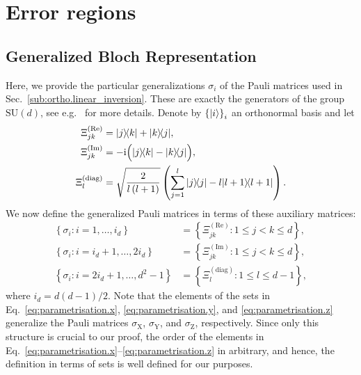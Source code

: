 
\chapter{Error regions}%
\label{cha:error_appendix}

\section{Generalized Bloch Representation}
\label{sec:error.parametrisation}

Here, we provide the particular generalizations $\sigma_{i}$ of the Pauli matrices used in Sec.~\ref{sub:ortho.linear_inversion}.
These are exactly the generators of the group $\mathrm{SU}(d)$, see e.g.~\cite{Kimura_2003_Bloch,Byrd_2003_Characterization} for more details.
Denote by  ${\{\ket{i}\}}_i$ an orthonormal basis and let
\begin{align*}
  \Xi_{jk}^{(\textrm{Re})} &=  \ket{j}\bra{k} + \ket{k}\bra{j}, \\
  \Xi_{jk}^{(\textrm{Im})} &= -\ii \Big(\ket{j}\bra{k} - \ket{k}\bra{j}\Big), \\
  \Xi_{l}^{(\textrm{diag})} &= \sqrt{\frac{2}{l\left(l+1\right)}}\left(\sum_{j=1}^{l} \ket{j}\bra{j} - l \ket{l+1}\bra{l+1} \right).
\end{align*}
We now define the generalized Pauli matrices in terms of these auxiliary matrices:
\begin{align}
  \label{eq:parametrisation.x}
  \left\{ \sigma_{i}:i=1,\ldots,i_{d}\right\} &= \left\{ \Xi_{jk}^{(\textrm{Re})}:1\leq j<k\leq d\right\},  \\
  \label{eq:parametrisation.y}
  \left\{ \sigma_{i}:i=i_{d}+1,\ldots,2i_{d}\right\} &= \left\{ \Xi_{jk}^{(\textrm{Im})}:1\leq j<k\leq d\right\}, \\
  \label{eq:parametrisation.z}
  \left\{ \sigma_{i}:i=2i_{d}+1,\ldots,d^{2}-1\right\} &= \left\{ \Xi_{l}^{(\textrm{diag})}:1\leq l\leq d-1\right\},
\end{align}
where $i_{d}=d(d-1)/2$.
Note that the elements of the sets in Eq.~\eqref{eq:parametrisation.x}, \eqref{eq:parametrisation.y}, and \eqref{eq:parametrisation.z} generalize the Pauli matrices $\sigma_\mathrm{X}$, $\sigma_\mathrm{Y}$, and $\sigma_\mathrm{Z}$, respectively.
Since only this structure is crucial to our proof, the order of the elements in Eq.~\eqref{eq:parametrisation.x}--\eqref{eq:parametrisation.z} in arbitrary, and hence, the definition in terms of sets is well defined for our purposes.

